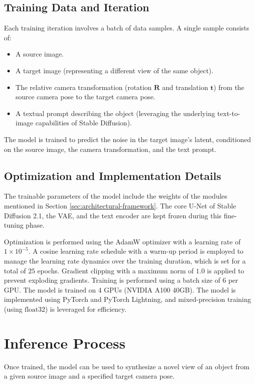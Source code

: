\subsection{Training Data and Iteration}
Each training iteration involves a batch of data samples. A single sample consists of:
\begin{itemize}
  \item A source image.
  \item A target image (representing a different view of the same object).
  \item The relative camera transformation (rotation $\mathbf{R}$ and translation $\mathbf{t}$) from the source camera pose to the target camera pose.
  \item A textual prompt describing the object (leveraging the underlying text-to-image capabilities of Stable Diffusion).
\end{itemize}
The model is trained to predict the noise in the target image's latent, conditioned on the source image, the camera transformation, and the text prompt.

\subsection{Optimization and Implementation Details}
The trainable parameters of the model include the weights of the modules mentioned in Section \ref{sec:architectural-framework}. The core U-Net of Stable Diffusion 2.1, the VAE, and the text encoder are kept frozen during this fine-tuning phase.

Optimization is performed using the AdamW optimizer \cite{adamw} with a learning rate of $1 \times 10^{-5}$. A cosine learning rate schedule with a warm-up period is employed to manage the learning rate dynamics over the training duration, which is set for a total of $25$ epochs. Gradient clipping with a maximum norm of $1.0$ is applied to prevent exploding gradients. Training is performed using a batch size of $6$ per GPU. The model is trained on 4 GPUs (NVIDIA A100 40GB). The model is implemented using PyTorch and PyTorch Lightning, and mixed-precision training (using $\text{float32}$) is leveraged for efficiency.

\section{Inference Process}
Once trained, the model can be used to synthesize a novel view of an object from a given source image and a specified target camera pose.

